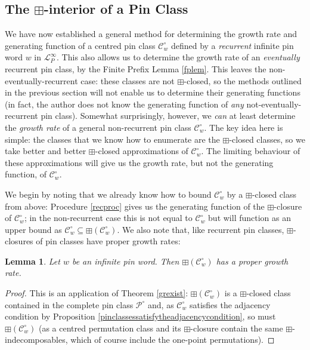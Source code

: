 \documentclass[11pt,a4paper]{article}
\newtheorem{lemma}[thm]{Lemma}
\theoremstyle{definition}
\begin{document}
\subsection{The $\boxplus$-interior of a Pin Class} \label{sec:4.1}

We have now established a general method for determining the growth rate and generating function of a centred pin class $\mathcal{C}^{\circ}_{w}$ defined by a \emph{recurrent} infinite pin word $w$ in $\mathcal{L}^{\infty}_{P}$. This also allows us to determine the growth rate of an \emph{eventually} recurrent pin class, by the Finite Prefix Lemma \ref{fplem}. This leaves the non-eventually-recurrent case: these classes are not $\boxplus$-closed, so the methods outlined in the previous section will not enable us to determine their generating functions (in fact, the author does not know the generating function of \emph{any} not-eventually-recurrent pin class). Somewhat surprisingly, however, we \emph{can} at least determine the \emph{growth rate} of a general non-recurrent pin class $\mathcal{C}^{\circ}_{w}$. The key idea here is simple: the classes that we know how to enumerate are the $\boxplus$-closed classes, so we take better and better $\boxplus$-closed approximations of $\mathcal{C}^{\circ}_{w}$. The limiting behaviour of these approximations will give us the growth rate, but not the generating function, of $\mathcal{C}^{\circ}_{w}$.

We begin by noting that we already know how to bound $\mathcal{C}^{\circ}_{w}$ by a $\boxplus$-closed class from above: Procedure \ref{recproc} gives us the generating function of the $\boxplus$-closure of $\mathcal{C}^{\circ}_{w}$; in the non-recurrent case this is not equal to $\mathcal{C}^{\circ}_{w}$ but will function as an upper bound as $\mathcal{C}^{\circ}_{w} \subseteq \boxplus(\mathcal{C}^{\circ}_{w})$. We also note that, like recurrent pin classes, $\boxplus$-closures of pin classes have proper growth rates:

\begin{lemma}
Let $w$ be an infinite pin word. Then $\boxplus(\mathcal{C}^{\circ}_{w})$ has a proper growth rate.
\end{lemma}

\begin{proof}
This is an application of Theorem \ref{grexist}: $\boxplus(\mathcal{C}^{\circ}_{w})$ is a $\boxplus$-closed class contained in the complete pin class $\mathcal{P}^{\circ}$ and, as $\mathcal{C}^{\circ}_{w}$ satisfies the adjacency condition by Proposition \ref{pinclassessatisfytheadjacencycondition}, so must $\boxplus(\mathcal{C}^{\circ}_{w})$ (as a centred permutation class and its $\boxplus$-closure contain the same $\boxplus$-indecomposables, which of course include the one-point permutations).\end{proof}
\end{document}
